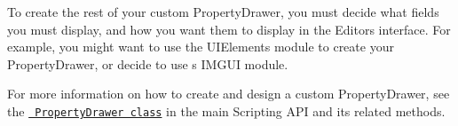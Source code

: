 To create the rest of your custom Property\+Drawer, you must decide what fields you must display, and how you want them to display in the Editor\textquotesingle{}s interface. For example, you might want to use the UIElements module to create your Property\+Drawer, or decide to use \textquotesingle{}s IMGUI module.

For more information on how to create and design a custom Property\+Drawer, see the \href{https://docs.unity3d.com/ScriptReference/PropertyDrawer.html}{\texttt{ Property\+Drawer class}} in the main  Scripting API and its related methods. 